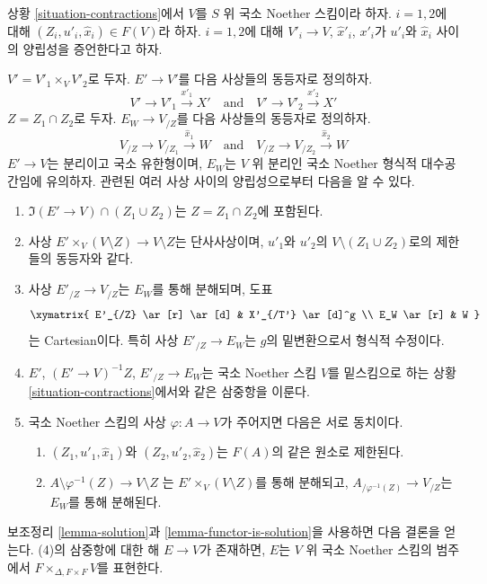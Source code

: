 \begin{remark}
\label{remark-diagonal}
상황 \ref{situation-contractions}에서 $V$를 $S$ 위 국소 Noether 스킴이라 하자.
$i = 1, 2$에 대해 $(Z_i, u'_i, \hat x_i) \in F(V)$라 하자.
$i = 1, 2$에 대해 $V'_i \to V$, $\hat x'_i$, $x'_i$가
$u'_i$와 $\hat x_i$ 사이의 양립성을 증언한다고 하자.

\medskip\noindent
$V' = V'_1 \times_V V'_2$로 두자. $E' \to V'$를 다음 사상들의
동등자로 정의하자.
$$
V' \to V'_1 \xrightarrow{x'_1} X'
\quad\text{and}\quad
V' \to V'_2 \xrightarrow{x'_2} X'
$$
$Z = Z_1 \cap Z_2$로 두자. $E_W \to V_{/Z}$를 다음 사상들의
동등자로 정의하자.
$$
V_{/Z} \to V_{/Z_1} \xrightarrow{\hat x_1} W
\quad\text{and}\quad
V_{/Z} \to V_{/Z_2} \xrightarrow{\hat x_2} W
$$
$E' \to V$는 분리이고 국소 유한형이며,
$E_W$는 $V$ 위 분리인 국소 Noether 형식적 대수공간임에 유의하자.
관련된 여러 사상 사이의 양립성으로부터 다음을 알 수 있다.
\begin{enumerate}
\item $\Im(E' \to V) \cap (Z_1 \cup Z_2)$는
$Z = Z_1 \cap Z_2$에 포함된다.
\item 사상 $E' \times_V (V \setminus Z) \to V \setminus Z$는 단사사상이며,
$u'_1$와 $u'_2$의 $V \setminus (Z_1 \cup Z_2)$로의 제한들의 동등자와 같다.
\item 사상 $E'_{/Z} \to V_{/Z}$는 $E_W$를 통해 분해되며, 도표
$$
\xymatrix{
E'_{/Z} \ar[r] \ar[d] & X'_{/T'} \ar[d]^g \\
E_W \ar[r] & W
}
$$
는 Cartesian이다. 특히 사상 $E'_{/Z} \to E_W$는 $g$의 밑변환으로서
형식적 수정이다.
\item %
$E'$, $(E' \to V)^{-1}Z$, $E'_{/Z} \to E_W$는 국소 Noether 스킴
$V$를 밑스킴으로 하는 상황 \ref{situation-contractions}에서와 같은
삼중항을 이룬다.
\item 국소 Noether 스킴의 사상 $\varphi : A \to V$가 주어지면
다음은 서로 동치이다.
\begin{enumerate}
\item $(Z_1, u'_1, \hat x_1)$와 $(Z_2, u'_2, \hat x_2)$는
$F(A)$의 같은 원소로 제한된다.
\item $A \setminus \varphi^{-1}(Z) \to V \setminus Z$
는 $E' \times_V (V \setminus Z)$를 통해 분해되고,
$A_{/\varphi^{-1}(Z)} \to V_{/Z}$는 $E_W$를 통해 분해된다.
\end{enumerate}
\end{enumerate}
보조정리 \ref{lemma-solution}과 \ref{lemma-functor-is-solution}을 사용하면
다음 결론을 얻는다. (4)의 삼중항에 대한 해 $E \to V$가 존재하면,
$E$는 $V$ 위 국소 Noether 스킴의 범주에서
$F \times_{\Delta, F \times F} V$를 표현한다.
\end{remark}

